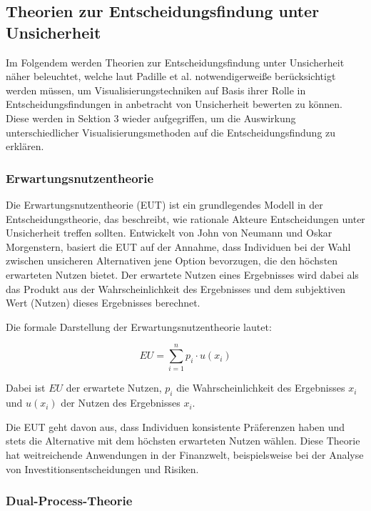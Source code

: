 \subsection{Theorien zur Entscheidungsfindung unter Unsicherheit}
Im Folgendem werden Theorien zur Entscheidungsfindung unter Unsicherheit näher beleuchtet, welche laut Padille et al. notwendigerweiße berücksichtigt
werden müssen, um Visualisierungstechniken auf Basis ihrer Rolle in Entscheidungsfindungen in anbetracht von Unsicherheit bewerten zu können. Diese 
werden in Sektion 3 wieder aufgegriffen, um die Auswirkung unterschiedlicher Visualisierungsmethoden auf die Entscheidungsfindung zu erklären. \cite{VisualizationPsychology2023}

\subsubsection{Erwartungsnutzentheorie}

Die Erwartungsnutzentheorie (\ac{EUT}) ist ein grundlegendes Modell in der Entscheidungstheorie, das beschreibt, wie rationale Akteure Entscheidungen unter Unsicherheit 
treffen sollten. Entwickelt von John von Neumann und Oskar Morgenstern, basiert die EUT auf der Annahme, dass Individuen bei der 
Wahl zwischen unsicheren Alternativen jene Option bevorzugen, die den höchsten erwarteten Nutzen bietet. Der erwartete Nutzen eines 
Ergebnisses wird dabei als das Produkt aus der Wahrscheinlichkeit des Ergebnisses und dem subjektiven Wert (Nutzen) dieses Ergebnisses 
berechnet.

Die formale Darstellung der Erwartungsnutzentheorie lautet:

\begin{equation}
EU = \sum_{i=1}^{n} p_i \cdot u(x_i)
\end{equation}

Dabei ist \( EU \) der erwartete Nutzen, \( p_i \) die Wahrscheinlichkeit des Ergebnisses \( x_i \) und \( u(x_i) \) der Nutzen des 
Ergebnisses \( x_i \).

Die EUT geht davon aus, dass Individuen konsistente Präferenzen haben und stets die Alternative mit dem höchsten erwarteten Nutzen 
wählen. \cite{vonNeumann1944} Diese Theorie hat weitreichende Anwendungen in der Finanzwelt, beispielsweise bei der Analyse von 
Investitionsentscheidungen und Risiken. 

\subsubsection{Dual-Process-Theorie}

